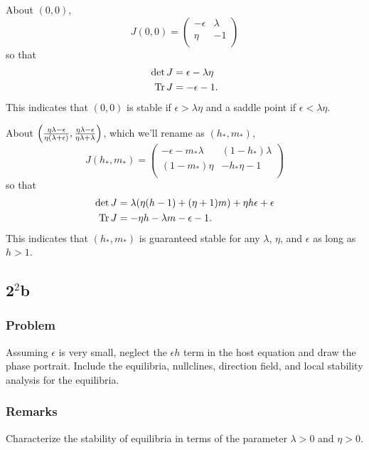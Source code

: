 \documentclass[12pt]{article}
\begin{document}
About $(0,0)$,
\begin{equation*}
  J(0,0) =
  \begin{pmatrix}
    -\epsilon & \lambda \\
    \eta & -1 \\
  \end{pmatrix}
\end{equation*}
so that
\begin{equation*}
  \begin{aligned}
    \det{J} &= \epsilon-\lambda\eta \\
    \operatorname{Tr}{J} &= -\epsilon-1. \\
  \end{aligned}
\end{equation*}
This indicates that $(0,0)$ is stable if $\epsilon>\lambda\eta$ and a saddle
point if $\epsilon<\lambda\eta$.

About $\left(\frac{\eta\lambda-\epsilon}{\eta(\lambda+\epsilon)}, \frac{\eta\lambda-\epsilon}{\eta\lambda+\lambda}\right)$, which we'll rename as
$(h_*,m_*)$,
\begin{equation*}
  J(h_*,m_*) =
  \begin{pmatrix}
    -\epsilon-m_*\lambda & (1-h_*)\lambda \\
    (1-m_*)\eta  & -h_*\eta-1 \\
  \end{pmatrix}
\end{equation*}
so that
\begin{equation*}
  \begin{aligned}
    \det{J} &= \lambda(\eta(h-1)+(\eta+1)m)+\eta h\epsilon+\epsilon \\
    \operatorname{Tr}{J} &= -\eta h-\lambda m-\epsilon-1. \\
  \end{aligned}
\end{equation*}
This indicates that $(h_*,m_*)$ is guaranteed stable for any $\lambda$, $\eta$,
and $\epsilon$ as long as $h>1$.

\newpage
\subsection{2$^2$b}
\subsubsection*{Problem}
Assuming $\epsilon$ is very small, neglect the $\epsilon h$ term in the host equation
and draw the phase portrait. Include the equilibria, nullclines, direction
field, and local stability analysis for the equilibria.

\subsubsection*{Remarks}
Characterize the stability of equilibria in terms of the parameter $\lambda>0$
and $\eta>0$.
\end{document}
